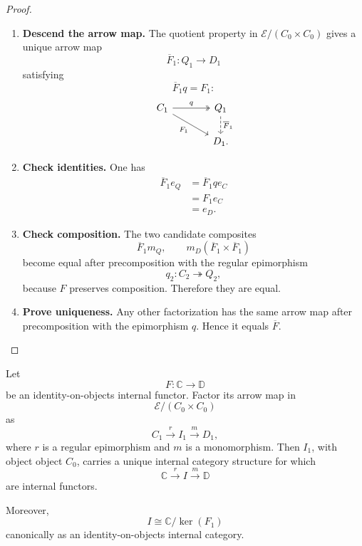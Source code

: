 \begin{proof}
    \leavevmode
    \begin{enumerate}
        \item \textbf{Descend the arrow map.}
        The quotient property in
        \(\mathcal E/(C_0\times C_0)\) gives a unique arrow map
        \[
            \overline F_1:Q_1\to D_1
        \]
        satisfying
        \[
            \overline F_1q=F_1:
        \]
        \[
        \begin{tikzcd}[column sep=large]
            C_1
                \arrow[r, two heads, "q"]
                \arrow[dr, "F_1"']
            &
            Q_1
                \arrow[d, dashed, "\overline F_1"]
            \\
            &
            D_1.
        \end{tikzcd}
        \]

        \item \textbf{Check identities.}
        One has
        \[
        \begin{aligned}
            \overline F_1e_Q
            &=
            \overline F_1q e_C
            \\
            &=
            F_1e_C
            \\
            &=
            e_D.
        \end{aligned}
        \]

        \item \textbf{Check composition.}
        The two candidate composites
        \[
            \overline F_1m_Q,
            \qquad
            m_D(\overline F_1\times\overline F_1)
        \]
        become equal after precomposition with the regular epimorphism
        \[
            q_2:C_2\twoheadrightarrow Q_2,
        \]
        because \(F\) preserves composition. Therefore they are equal.

        \item \textbf{Prove uniqueness.}
        Any other factorization has the same arrow map after precomposition
        with the epimorphism \(q\). Hence it equals \(\overline F\).
    \end{enumerate}
\end{proof}

\begin{lemma}
\label{lem:to-create-ioo-regular-image}
    Let
    \[
        F:\mathbb C\to\mathbb D
    \]
    be an identity-on-objects internal functor. Factor its arrow map in
    \[
        \mathcal E/(C_0\times C_0)
    \]
    as
    \[
        C_1
        \xrightarrow{r}
        I_1
        \xrightarrow{m}
        D_1,
    \]
    where \(r\) is a regular epimorphism and \(m\) is a monomorphism. Then
    \(I_1\), with object object \(C_0\), carries a unique internal category
    structure for which
    \[
        \mathbb C
        \xrightarrow{r}
        I
        \xrightarrow{m}
        \mathbb D
    \]
    are internal functors.

    Moreover,
    \[
        I\cong\mathbb C/\ker(F_1)
    \]
    canonically as an identity-on-objects internal category.
\end{lemma}

